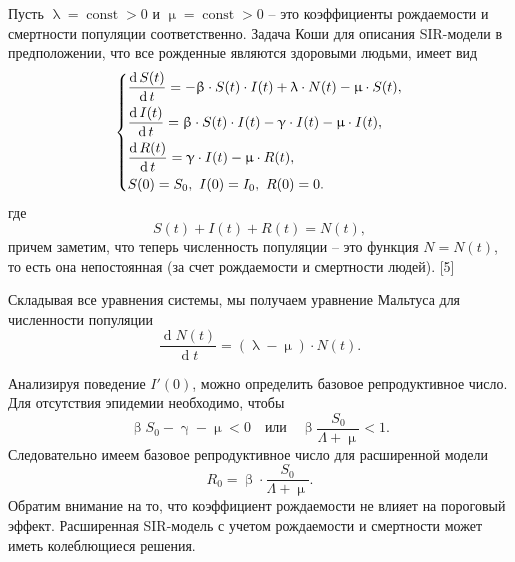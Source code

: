 \documentclass[a4paper, 14pt]{extreport}
\renewcommand{\beta}{\upbeta}
\renewcommand{\gamma}{\upgamma}
\renewcommand{\lambda}{\uplambda}
\renewcommand{\mu}{\upmu}
\renewcommand{\d}{\operatorname{d}}
\begin{document}
	Пусть $\lambda = \operatorname{const} > 0$ и $\mu = \operatorname{const} > 0$ -- это коэффициенты рождаемости и смертности популяции соответственно. Задача Коши для описания SIR-модели в предположении, что все рожденные являются здоровыми людьми, имеет вид 
	\begin{equation}
		\begin{dcases}
		\dfrac {\d S(t)}{\d t} = -\beta \cdot S(t) \cdot I(t) + \lambda\cdot N(t) - \mu\cdot S(t),\\
		\dfrac{\d I(t)}{\d t} = \beta \cdot S(t)\cdot I(t) - \gamma\cdot I(t) - \mu\cdot I(t),\\
		\dfrac{\d R(t)}{\d t} = \gamma\cdot I(t) - \mu \cdot R(t),\\
		S(0) = S_0, \ I(0) = I_0,\ R(0) = 0.
		\end{dcases}
	\end{equation}
	где $$S(t) + I(t) + R(t) = N(t),$$ причем заметим, что теперь численность популяции -- это функция $N = N(t)$, то есть она непостоянная (за счет рождаемости и смертности людей). [5]
	
	Складывая все уравнения системы, мы получаем уравнение Мальтуса для численности популяции 
	\begin{equation}
	\dfrac{\d N(t)}{\d t} = (\lambda-\mu) \cdot N(t).
	\end{equation}
	
	Анализируя поведение $I'(0)$, можно определить базовое репродуктивное число. Для отсутствия эпидемии необходимо, чтобы $$\beta S_0 - \gamma - \mu < 0 \quad \text{или}\quad \beta \dfrac{S_0}{\Lambda+\mu} < 1.$$
	Следовательно имеем базовое репродуктивное число для расширенной модели $$R_0 = \beta \cdot \dfrac{S_0}{\Lambda+\mu}.$$ Обратим внимание на то, что коэффициент рождаемости не влияет на пороговый
	эффект. Расширенная SIR-модель с учетом рождаемости и смертности может иметь колеблющиеся решения.
	
\end{document}
